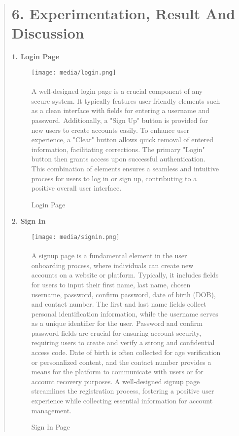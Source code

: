 \documentclass[12pt]{report}
\begin{document}
	
	\begin{quote}
		\section{6. Experimentation, Result And Discussion}
		\textbf{1. Login Page}
		\begin{figure}[h]
			\centering
			\texttt{[image: media/login.png]}\\
			\caption{Login Page}
			\vspace{0.5cm}	
			\paragraph{}
			\justify
			A well-designed login page is a crucial component of any secure system. It typically features user-friendly elements such as a clean interface with fields for entering a username and password. Additionally, a "Sign Up" button is provided for new users to create accounts easily. To enhance user experience, a "Clear" button allows quick removal of entered information, facilitating corrections. The primary "Login" button then grants access upon successful authentication. This combination of elements ensures a seamless and intuitive process for users to log in or sign up, contributing to a positive overall user interface.
		\end{figure}
	\clearpage
		\textbf{2. Sign In}
		\begin{figure}[h]
			\centering
			\texttt{[image: media/signin.png]}\\
			\caption{Sign In Page}
			\vspace{0.5cm}
			\paragraph{}
			\justifying
			A signup page is a fundamental element in the user onboarding process, where individuals can create new accounts on a website or platform. Typically, it includes fields for users to input their first name, last name, chosen username, password, confirm password, date of birth (DOB), and contact number. The first and last name fields collect personal identification information, while the username serves as a unique identifier for the user. Password and confirm password fields are crucial for ensuring account security, requiring users to create and verify a strong and confidential access code. Date of birth is often collected for age verification or personalized content, and the contact number provides a means for the platform to communicate with users or for account recovery purposes. A well-designed signup page streamlines the registration process, fostering a positive user experience while collecting essential information for account management.
		\end{figure}
		

\end{quote}
\end{document}

